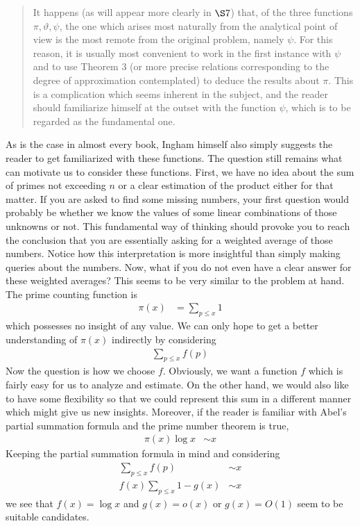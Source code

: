 \documentclass[elemannt.tex]{subfile}
\begin{document}
		\begin{quote}
			It happens (as will appear more clearly in $\S7$) that, of the three functions $\pi,\vartheta,\psi$, the one which arises most naturally from the analytical point of view is the most remote from the original problem, namely $\psi$. For this reason, it is usually most convenient to work in the first instance with $\psi$ and to use Theorem 3 (or more precise relations corresponding to the degree of approximation contemplated) to deduce the results about $\pi$. This is a complication which seems inherent in the subject, and the reader should familiarize himself at the outset with the function $\psi$, which is to be regarded as the fundamental one.
		\end{quote}
	As is the case in almost every book, Ingham himself also simply suggests the reader to get familiarized with these functions. The question still remains what can motivate us to consider these functions. First, we have no idea about the sum of primes not exceeding $n$ or a clear estimation of the product either for that matter. If you are asked to find some missing numbers, your first question would probably be whether we know the values of some linear combinations of those unknowns or not. This fundamental way of thinking should provoke you to reach the conclusion that you are essentially asking for a weighted average of those numbers. Notice how this interpretation is more insightful than simply making queries about the numbers. Now, what if you do not even have a clear answer for these weighted averages? This seems to be very similar to the problem at hand. The prime counting function is
		\begin{align*}
			\pi(x)
				& = \sum_{p\leq x}1
		\end{align*}
	which possesses no insight of any value. We can only hope to get a better understanding of $\pi(x)$ indirectly by considering
		\begin{align*}
			\sum_{p\leq x}f(p)
		\end{align*}
	Now the question is how we choose $f$. Obviously, we want a function $f$ which is fairly easy for us to analyze and estimate. On the other hand, we would also like to have some flexibility so that we could represent this sum in a different manner which might give us new insights. Moreover, if the reader is familiar with Abel's partial summation formula and the prime number theorem is true,
		\begin{align*}
			\pi(x)\log{x}
				& \sim x
		\end{align*}
	Keeping the partial summation formula in mind and considering
		\begin{align*}
			\sum_{p\leq x}f(p)
				& \sim x\\
			f(x)\sum_{p\leq x}1-g(x)
				& \sim x
		\end{align*}
	we see that $f(x)=\log{x}$ and $g(x)=o(x)$ or $g(x)=O(1)$ seem to be suitable candidates.
\end{document}
